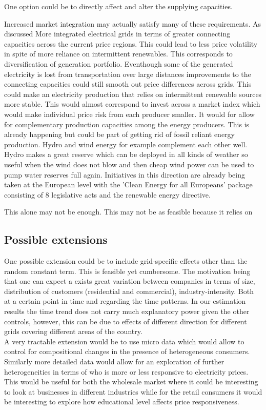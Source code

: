 One option could be to directly affect and alter the supplying capacities.

Increased market integration may actually satisfy many of these requirements. As discussed  More integrated electrical grids in terms of greater connecting capacities across the current price regions. This could lead to less price volatility in spite of more reliance on intermittent renewables. This corresponds to diversification of generation portfolio.  Eventhough some of the generated electricity is lost from transportation over large distances improvements to the connecting capacities could still smooth out price differences across grids. This could make an electricity production that relies on intermittent renewable sources more stable. This would almost correspond to invest across a market index which would make individual price risk from each producer smaller. It would for allow for complementary production capacities among the energy producers. This is already happening but could be part of getting rid of fossil reliant energy production. Hydro and wind energy for example complement each other well. Hydro makes a great reserve which can be deployed in all kinds of weather so useful when the wind does not blow and then cheap wind power can be used to pump water reserves full again. Initiatives in this direction are already being taken at the European level with the 'Clean Energy for all Europeans' package consisting of 8 legislative acts and the renewable energy directive. 

This alone may not be enough. This may not be as feasible because it relies on



\subsection{Possible extensions}
\label{subsec:r_extensions}
One possible extension could be to include grid-specific effects other than the random constant term. This is feasible yet cumbersome. The motivation being that one can expect a exists great variation between companies in terms of size, distribution of customers (residential and commercial), industry-intensity. Both at a certain point in time and regarding the time patterns. In our estimation results the time trend does not carry much explanatory power given the other controls, however, this can be due to effects of different direction for different grids covering different areas of the country.
\medskip\\
A very tractable extension would be to use micro data which would allow to control for compositional changes in the presence of heterogeneous consumers. Similarly more detailed data would allow for an exploration of further heterogeneities in terms of who is more or less responsive to electricity prices. This would be useful for both the wholesale market where it could be interesting to look at businesses in different industries while for the retail consumers it would be interesting to explore how educational level affects price responsiveness. 

